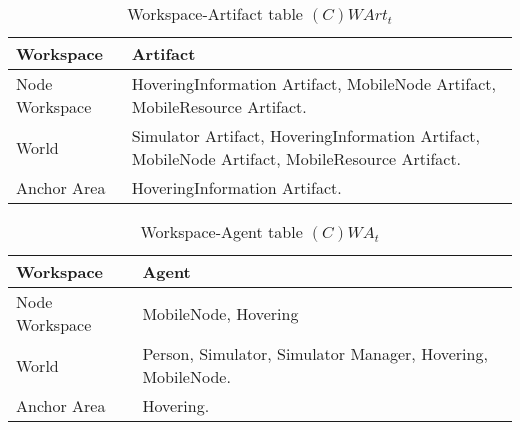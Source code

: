 \begin{table}[H]
	\centering
	\begin{tabular}{|p{4cm}|p{8cm}|}
			\hline
			\textbf{Workspace} & \textbf{Artifact} \\
			\hline
			Node Workspace & HoveringInformation Artifact, MobileNode Artifact,
			MobileResource Artifact. \\
			\hline
      World & Simulator Artifact, HoveringInformation Artifact, MobileNode
      Artifact, MobileResource Artifact. \\
			\hline
			Anchor Area & HoveringInformation Artifact. \\
			\hline
		\end{tabular}
	\caption{Workspace-Artifact table $(C)WArt_t$}
	\label{tab:cwartt}
\end{table}

\begin{table}[H]
	\centering
	\begin{tabular}{|p{4cm}|p{8cm}|}
			\hline
			\textbf{Workspace} & \textbf{Agent} \\
			\hline
			Node Workspace & MobileNode, Hovering \\
			\hline
      World & Person, Simulator, Simulator Manager, Hovering, MobileNode. \\
			\hline
			Anchor Area & Hovering. \\
			\hline
		\end{tabular}
	\caption{Workspace-Agent table $(C)WA_t$}
	\label{tab:cwat}
\end{table}
